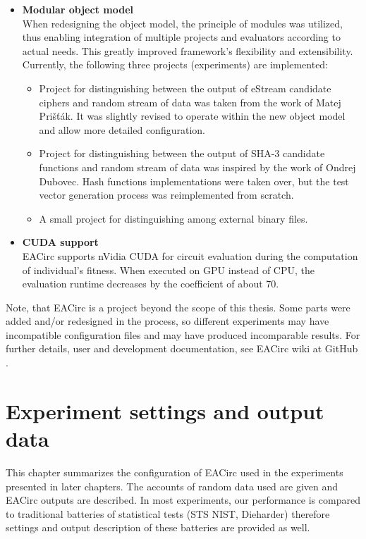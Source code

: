 \documentclass[12pt,oneside]{fithesis2}		%
\renewcommand{\_}{\leavevmode \kern0.0em\vbox{\hrule width0.4em}}
\newcommand{\squarebullet}{\textcolor{black}{\raisebox{0.15em}{\rule{4pt}{4pt}}}}
\newenvironment{myItemize}{
  \begin{itemize}[leftmargin=2em,rightmargin=1em,itemsep=\parskip ,parsep=0em,topsep=0em,partopsep=0em]
  \renewcommand{\labelitemi}{\squarebullet}
  \renewcommand{\labelitemii}{$\diamond$}
}{
  \end{itemize}
}
\begin{document}
\begin{myItemize}
and circumvents most parts of the EACirc framework, mainly the evolution and software circuit emulation.
The independence of this process is of utmost importance, since it provides supporting evidence for the achieved results.
\item \textbf{Modular object model}\\
When redesigning the object model, the principle of modules was utilized, thus enabling integration of multiple projects 
and evaluators according to actual needs. This greatly improved framework's flexibility and extensibility.
Currently, the following three projects (experiments) are implemented:
\begin{myItemize}
\item Project for distinguishing between the output of eStream candidate ciphers and random stream of data was taken from the work of 
Matej Prišťák.
It was slightly revised to operate within the new object model and allow more detailed configuration.
\item Project for distinguishing between the output of SHA-3 candidate functions and random stream of data was inspired by the work of 
Ondrej Dubovec.
Hash functions implementations were taken over, but the test vector generation process was reimplemented from scratch. 
\item A small project for distinguishing among external binary files.
\end{myItemize}
\item \textbf{CUDA support}\\
EACirc supports nVidia CUDA for circuit evaluation during the computation of individual's fitness.
When executed on GPU instead of CPU, the evaluation runtime decreases by the coefficient of about 70.
\end{myItemize}

\noindent
Note, that EACirc is a project beyond the scope of this thesis. Some parts were added and/or redesigned in the process, so
different experiments may have incompatible configuration files and may have produced incomparable results.
For further details, user and development documentation, see EACirc wiki at GitHub \parencite{eacirc-github}.	

\chapter{Experiment settings and output data}
\label{chap:settings}

This chapter summarizes the configuration of EACirc used in the experiments presented in later chapters.
The accounts of random data used are given and EACirc outputs are described. 
In most experiments, our performance is compared to traditional batteries of statistical tests (STS NIST, Dieharder)
therefore settings and output description of these batteries are provided as well.
\end{document}
